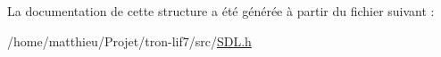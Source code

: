 La documentation de cette structure a été générée à partir du fichier suivant \-:\begin{DoxyCompactItemize}
\item 
/home/matthieu/\-Projet/tron-\/lif7/src/\hyperlink{SDL_8h}{S\-D\-L.\-h}\end{DoxyCompactItemize}
